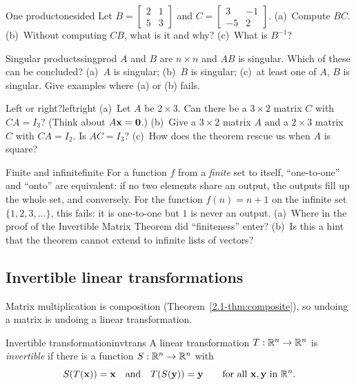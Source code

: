 \documentclass[11pt]{article}
\begin{document}
\begin{kc}{One product}{onesided}
Let $B=\begin{bmatrix}2&1\\5&3\end{bmatrix}$ and $C=\begin{bmatrix}3&-1\\-5&2\end{bmatrix}$. (a)~Compute $BC$. (b)~Without computing $CB$, what is it and why? (c)~What is $B^{-1}$?
\end{kc}

\begin{kc}{Singular products}{singprod}
$A$ and $B$ are $n\times n$ and $AB$ is singular. Which of these can be concluded? (a)~$A$ is singular; (b)~$B$ is singular; (c)~at least one of $A$, $B$ is singular. Give examples where (a) or (b) fails.
\end{kc}

\begin{think}{Left or right?}{leftright}
(a)~Let $A$ be $2\times3$. Can there be a $3\times2$ matrix $C$ with $CA=I_3$? (Think about $A\mathbf{x}=\mathbf{0}$.) (b)~Give a $3\times2$ matrix $A$ and a $2\times3$ matrix $C$ with $CA=I_2$. Is $AC=I_3$? (c)~How does the theorem rescue us when $A$ is square?
\end{think}

\begin{think}{Finite and infinite}{finite}
For a function $f$ from a \emph{finite} set to itself, ``one-to-one'' and ``onto'' are equivalent: if no two elements share an output, the outputs fill up the whole set, and conversely. For the function $f(n)=n+1$ on the infinite set $\{1,2,3,\dots\}$, this fails: it is one-to-one but $1$ is never an output. (a)~Where in the proof of the Invertible Matrix Theorem did ``finiteness'' enter? (b)~Is this a hint that the theorem cannot extend to infinite lists of vectors?
\end{think}

\subsection*{Invertible linear transformations}

Matrix multiplication is composition (Theorem~\ref{2.1-thm:composite}), so undoing a matrix is undoing a linear transformation.

\begin{defn}{Invertible transformation}{invtrans}
A linear transformation $T:\mathbb{R}^n\to\mathbb{R}^n$ is \emph{invertible} if there is a function $S:\mathbb{R}^n\to\mathbb{R}^n$ with
\[
S(T(\mathbf{x}))=\mathbf{x}\quad\text{and}\quad T(S(\mathbf{y}))=\mathbf{y}\qquad\text{for all }\mathbf{x},\mathbf{y}\text{ in }\mathbb{R}^n.
\]
\end{defn}
\end{document}
